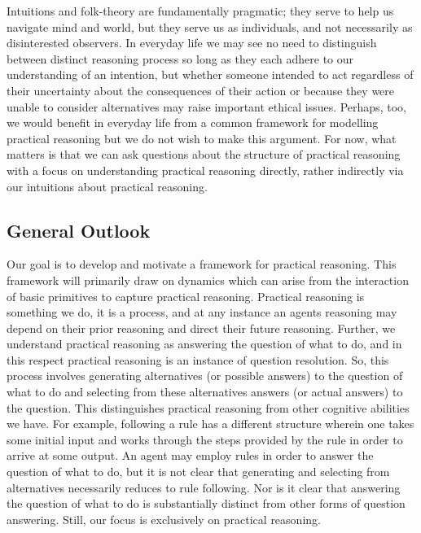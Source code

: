 \documentclass[10pt]{article}
\begin{document}
Intuitions and folk-theory are fundamentally pragmatic; they serve to help us navigate mind and world, but they serve us as individuals, and not necessarily as disinterested observers.
In everyday life we may see no need to distinguish between distinct reasoning process so long as they each adhere to our understanding of an intention, but whether someone intended to act regardless of their uncertainty about the consequences of their action or because they were unable to consider alternatives may raise important ethical issues.
Perhaps, too, we would benefit in everyday life from a common framework for modelling practical reasoning but we do not wish to make this argument.
For now, what matters is that we can ask questions about the structure of practical reasoning with a focus on understanding practical reasoning directly, rather indirectly via our intuitions about practical reasoning.


\subsection{General Outlook}
\label{sec:general-outlook}

Our goal is to develop and motivate a framework for practical reasoning.
This framework will primarily draw on dynamics which can arise from the interaction of basic primitives to capture practical reasoning.
Practical reasoning is something we do, it is a process, and at any instance an agents reasoning may depend on their prior reasoning and direct their future reasoning.
Further, we understand practical reasoning as answering the question of what to do, and in this respect practical reasoning is an instance of question resolution.
So, this process involves generating alternatives (or possible answers) to the question of what to do and selecting from these alternatives answers (or actual answers) to the question.
This distinguishes practical reasoning from other cognitive abilities we have.
For example, following a rule has a different structure wherein one takes some initial input and works through the steps provided by the rule in order to arrive at some output.
An agent may employ rules in order to answer the question of what to do, but it is not clear that generating and selecting from alternatives necessarily reduces to rule following.
Nor is it clear that answering the question of what to do is substantially distinct from other forms of question answering.
Still, our focus is exclusively on practical reasoning.
\end{document}
